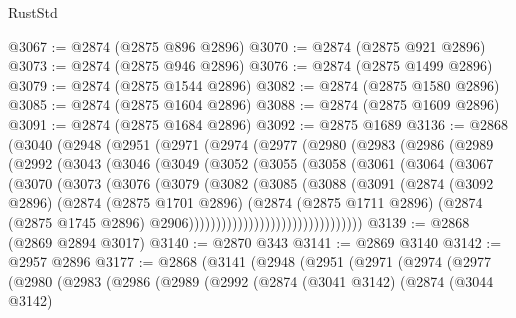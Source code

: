 \begin{lexlean}{RustStd}
\begin{coremodule}
{{{{{{{{{{{{{{{{{{{@3067 := @2874 (@2875 @896 @2896)
@3070 := @2874 (@2875 @921 @2896)
@3073 := @2874 (@2875 @946 @2896)
@3076 := @2874 (@2875 @1499 @2896)
@3079 := @2874 (@2875 @1544 @2896)
@3082 := @2874 (@2875 @1580 @2896)
@3085 := @2874 (@2875 @1604 @2896)
@3088 := @2874 (@2875 @1609 @2896)
@3091 := @2874 (@2875 @1684 @2896)
@3092 := @2875 @1689
@3136 := @2868
    (@3040
      (@2948
        (@2951
          (@2971
            (@2974
              (@2977
                (@2980
                  (@2983
                    (@2986
                      (@2989
                        (@2992
                          (@3043
                            (@3046
                              (@3049
                                (@3052
                                  (@3055
                                    (@3058
                                      (@3061
                                        (@3064
                                          (@3067
                                            (@3070
                                              (@3073
                                                (@3076
                                                  (@3079
                                                    (@3082
                                                      (@3085
                                                        (@3088
                                                          (@3091
                                                            (@2874
                                                              (@3092 @2896)
                                                              (@2874
                                                                (@2875 @1701 @2896)
                                                                (@2874
                                                                  (@2875 @1711 @2896)
                                                                  (@2874
                                                                    (@2875 @1745 @2896)
                                                                    @2906))))))))))))))))))))))))))))))))
@3139 := @2868 (@2869 @2894 @3017)
@3140 := @2870 @343
@3141 := @2869 @3140
@3142 := @2957 @2896
@3177 := @2868
    (@3141
      (@2948
        (@2951
          (@2971
            (@2974
              (@2977
                (@2980
                  (@2983
                    (@2986
                      (@2989
                        (@2992
                          (@2874
                            (@3041 @3142)
                            (@2874
                              (@3044 @3142)
}}}}}}}}}}}}}}}}}}}
\end{coremodule}
\end{lexlean}
